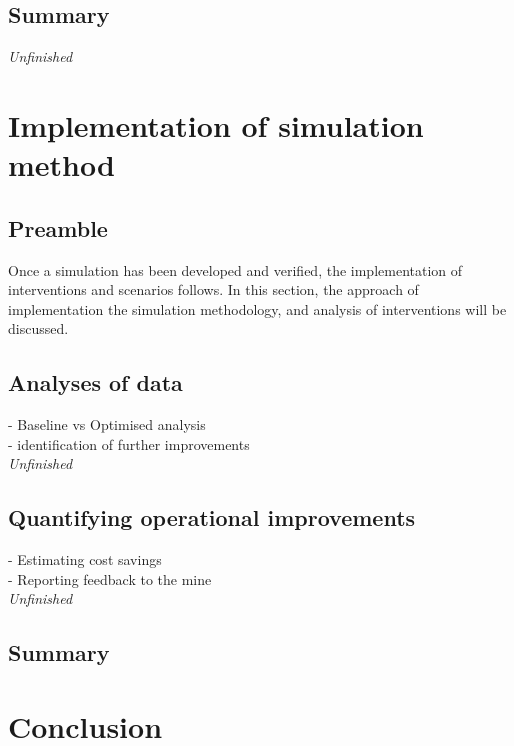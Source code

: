 	\subsection{Summary}
	\textit{Unfinished}
\section{Implementation of simulation method}
	\subsection{Preamble}
		Once a simulation has been developed and verified, the implementation of interventions and scenarios follows. In this section, the approach of implementation the simulation methodology, and analysis of interventions will be discussed.
	\subsection{Analyses of data}
		- Baseline vs Optimised analysis \\
		- identification of further improvements\\
		\textit{Unfinished}
	\subsection{Quantifying operational improvements}
		- Estimating cost savings \\
		- Reporting feedback to the mine\\
		\textit{Unfinished}
	\subsection{Summary}
\section{Conclusion}
